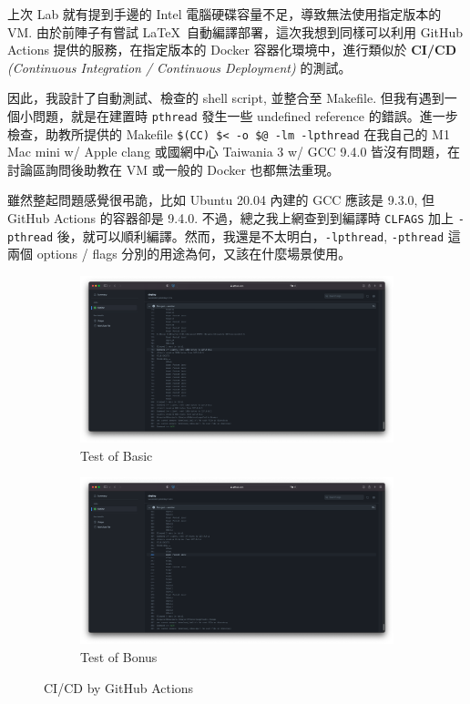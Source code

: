 \documentclass[12pt, a4paper]{article}
\begin{document}
上次 Lab 就有提到手邊的 Intel 電腦硬碟容量不足，導致無法使用指定版本的 VM. 由於前陣子有嘗試 \LaTeX~自動編譯部署，這次我想到同樣可以利用 GitHub Actions 提供的服務，在指定版本的 Docker 容器化環境中，進行類似於 \textbf{CI/CD} \textit{(Continuous Integration / Continuous Deployment)} 的測試。

因此，我設計了自動測試、檢查的 shell script, 並整合至 Makefile. 但我有遇到一個小問題，就是在建置時 \texttt{pthread} 發生一些 undefined reference 的錯誤。進一步檢查，助教所提供的 Makefile \texttt{\$(CC)  \$< -o \$@ -lm -lpthread} 在我自己的 M1 Mac mini w/ Apple clang 或國網中心 Taiwania 3 w/ GCC 9.4.0 皆沒有問題，在討論區詢問後助教在 VM 或一般的 Docker 也都無法重現。

雖然整起問題感覺很弔詭，比如 Ubuntu 20.04 內建的 GCC 應該是 9.3.0, 但 GitHub Actions 的容器卻是 9.4.0. 不過，總之我上網查到到編譯時 \texttt{CLFAGS} 加上 \texttt{-pthread} 後，就可以順利編譯。然而，我還是不太明白，\texttt{-lpthread}, \texttt{-pthread} 這兩個 options / flags 分別的用途為何，又該在什麼場景使用。

\begin{figure}
\centering
\begin{subfigure}{\linewidth}
\centering
\includegraphics[width=\linewidth]{ci-cd_basic}
\caption{Test of Basic}
\label{fig:ci-cd_basic}
\end{subfigure}
\begin{subfigure}{\linewidth}
\centering
\includegraphics[width=\linewidth]{ci-cd_bonus}
\caption{Test of Bonus}
\label{fig:ci-cd_bonus}
\end{subfigure}
\caption{CI/CD by GitHub Actions}
\end{figure}
\end{document}
